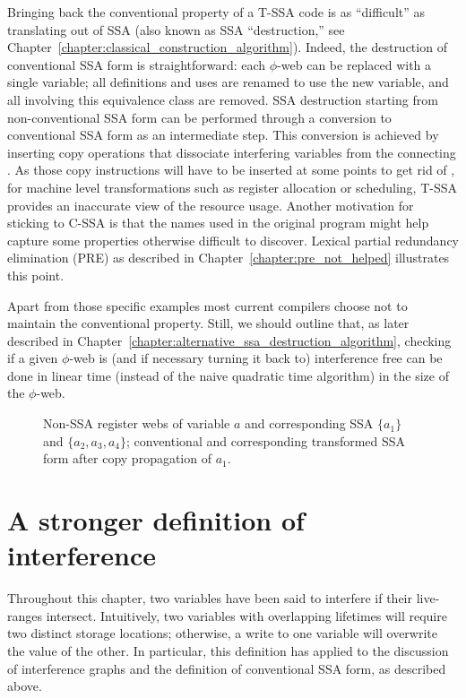 Bringing back the conventional property of a T-SSA code is as ``difficult'' as translating out of SSA (also known as SSA ``destruction,'' see Chapter~\ref{chapter:classical_construction_algorithm}). 
Indeed, the destruction of conventional SSA form is straightforward:  each $\phi$-web can be replaced with a single variable; 
all definitions and uses are renamed to use the new variable, and all \phifuns involving this equivalence class are removed. 
SSA destruction starting from non-conventional SSA form can be performed through a conversion to conventional SSA form as an intermediate step. 
This conversion is achieved by inserting copy operations that dissociate interfering variables from the connecting \phifuns. 
As those copy instructions will have to be inserted at some points to get rid of \phifuns, for machine level transformations such as register allocation or scheduling, T-SSA provides an inaccurate view of the resource usage. 
Another motivation for sticking to C-SSA is that the names used in the original program might help capture some properties otherwise difficult to discover. 
Lexical partial redundancy elimination (PRE) as described in Chapter~\ref{chapter:pre_not_helped} illustrates this point.

Apart from those specific examples most current compilers choose not to maintain the conventional property. 
Still, we should outline that, as later described in Chapter~\ref{chapter:alternative_ssa_destruction_algorithm}, checking if a given $\phi$-web is (and if necessary turning it back to) interference free can be done in linear time (instead of the naive quadratic time algorithm) in the size of the $\phi$-web.

\begin{figure}[h]
\caption{\protect{} Non-SSA register webs of variable $a$ and
\protect{} corresponding SSA \phiwebs $\{a_1\}$ and $\{a_2,a_3,a_4\}$; 
\protect{} conventional and 
\protect{} corresponding transformed SSA form after copy propagation of $a_1$.}
\label{fig:properties_and_flavors:conventional}
\end{figure}



\section{A stronger definition of interference}
\label{sec:properties_and_flavors:ultimate_interference}
Throughout this chapter, two variables have been said to interfere if their live-ranges intersect. 
Intuitively, two variables with overlapping lifetimes will require two distinct storage locations; 
otherwise, a write to one variable will overwrite the value of the other. 
In particular, this definition has applied to the discussion of interference graphs and the definition of conventional SSA form, as described above.

